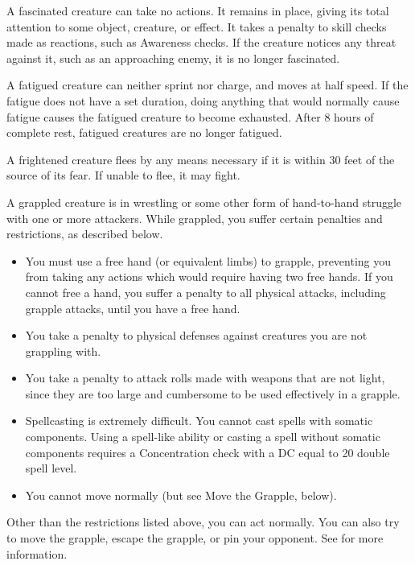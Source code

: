  A fascinated creature can take no actions. It remains in place, giving its total attention to some object, creature, or effect. It takes a  penalty to skill checks made as reactions, such as Awareness checks. If the creature notices any threat against it, such as an approaching enemy, it is no longer fascinated.

 A fatigued creature can neither sprint nor charge, and moves at half speed. If the fatigue does not have a set duration, doing anything that would normally cause fatigue causes the fatigued creature to become exhausted. After 8 hours of complete rest, fatigued creatures are no longer fatigued.

 A frightened creature flees by any means necessary if it is within 30 feet of the source of its fear. If unable to flee, it may fight.

 A grappled creature is in wrestling or some other form of hand-to-hand struggle with one or more attackers. While grappled, you suffer certain penalties and restrictions, as described below.

\begin{itemize}
    \item You must use a free hand (or equivalent limbs) to grapple, preventing you from taking any actions which would require having two free hands. If you cannot free a hand, you suffer a  penalty to all physical attacks, including grapple attacks, until you have a free hand.
    \item You take a  penalty to physical defenses against creatures you are not grappling with.
    \item You take a  penalty to attack rolls made with weapons that are not light, since they are too large and cumbersome to be used effectively in a grapple.
    \item Spellcasting is extremely difficult. You cannot cast spells with somatic components. Using a spell-like ability or casting a spell without somatic components requires a Concentration check with a DC equal to 20 \add double spell level.
    \item You cannot move normally (but see Move the Grapple, below).
\end{itemize}

Other than the restrictions listed above, you can act normally. You can also try to move the grapple, escape the grapple, or pin your opponent. See  for more information.


